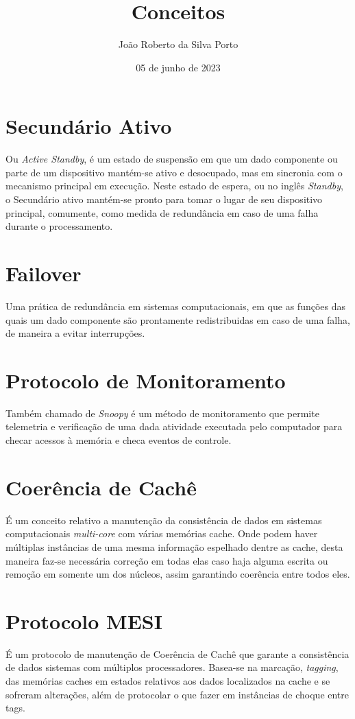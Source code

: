 \documentclass{article}
\begin{document}
      
\title{Conceitos}
\date{05 de junho de 2023}
\author{João Roberto da Silva Porto}

\section*{Secundário Ativo}
Ou \emph{Active Standby}, é um estado de suspensão em que um dado componente ou parte de um dispositivo mantém-se ativo e desocupado, mas em sincronia com o mecanismo principal em execução. Neste estado de espera, ou no inglês \emph{Standby}, o Secundário ativo mantém-se pronto para tomar o lugar de seu dispositivo principal, comumente, como medida de redundância em caso de uma falha durante o processamento.

\section*{Failover}
Uma prática de redundância em sistemas computacionais, em que as funções das quais um dado componente são prontamente redistribuidas em caso de uma falha, de maneira a evitar interrupções.

\section*{Protocolo de Monitoramento}
Também chamado de \emph{Snoopy} é um método de monitoramento que permite telemetria e verificação de uma dada atividade executada pelo computador para checar acessos à memória e checa eventos de controle.

\section*{Coerência de Cachê}
É um conceito relativo a manutenção da consistência de dados em sistemas computacionais \emph{multi-core} com várias memórias cache. Onde podem haver múltiplas instâncias de uma mesma informação espelhado dentre as cache, desta maneira faz-se necessária correção em todas elas caso haja alguma escrita ou remoção em somente um dos núcleos, assim garantindo coerência entre todos eles.

\section*{Protocolo MESI}
É um protocolo de manutenção de Coerência de Cachê que garante a consistência de dados sistemas com múltiplos processadores. Basea-se na marcação, \emph{tagging}, das memórias caches em estados relativos aos dados localizados na cache e se sofreram alterações, além de protocolar o que fazer em instâncias de choque entre tags.
\end{document}

